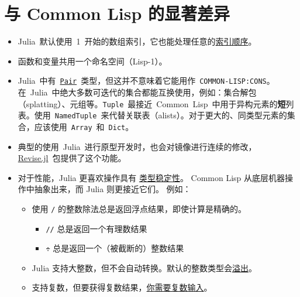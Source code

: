 \hypertarget{14324149948761873740}{}


\section{与 Common Lisp 的显著差异}



\begin{itemize}
\item Julia 默认使用 1 开始的数组索引，它也能处理任意的\hyperlink{1238988360302116626}{索引顺序}。


\item 函数和变量共用一个命名空间（{\textquotedbl}Lisp-1{\textquotedbl}）。


\item Julia 中有 \hyperlink{14946515604348703614}{\texttt{Pair}} 类型，但这并不意味着它能用作 \texttt{COMMON-LISP:CONS}。在 Julia 中绝大多数可迭代的集合都能互换使用，例如：集合解包（splatting）、元组等。\texttt{Tuple} 最接近 Common Lisp 中用于异构元素的\textbf{短}列表。使用 \texttt{NamedTuple} 来代替关联表（alists）。对于更大的、同类型元素的集合，应该使用 \texttt{Array} 和 \texttt{Dict}。


\item 典型的使用 Julia 进行原型开发时，也会对镜像进行连续的修改，\href{https://github.com/timholy/Revise.jl}{Revise.jl} 包提供了这个功能。


\item 对于性能，Julia 更喜欢操作具有 \hyperlink{5872221809740029239}{类型稳定性}。 Common Lisp 从底层机器操作中抽象出来，而 Julia 则更接近它们。 例如：

\begin{itemize}
\item 使用 \texttt{/} 的整数除法总是返回浮点结果，即使计算是精确的。

\begin{itemize}
\item \texttt{//} 总是返回一个有理数结果


\item \texttt{÷} 总是返回一个（被截断的）整数结果

\end{itemize}

\item Julia 支持大整数，但不会自动转换。默认的整数类型会\hyperlink{17610230595270045080}{溢出}。


\item 支持复数，但要获得复数结果，\hyperlink{1677964623674152967}{你需要复数输入}。



\end{itemize}
\end{itemize}
